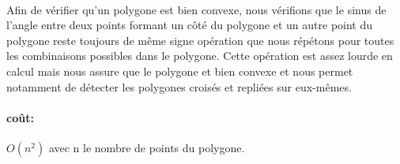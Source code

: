 \paragraph{}
Afin de vérifier qu'un polygone est bien convexe, nous vérifions que le sinus de l'angle entre deux points formant un côté du polygone et un autre point du polygone reste toujours de même signe opération que nous répétons pour toutes les combinaisons possibles dans le polygone. Cette opération est assez lourde en calcul mais nous assure que le polygone et bien convexe et nous permet notamment de détecter les polygones croisés et repliées sur eux-mêmes.
\paragraph{coût: }
\(O(n^2)\) avec n le nombre de points du polygone.




